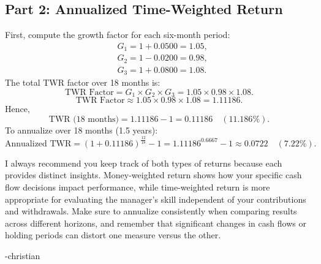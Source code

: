 \subsection*{Part 2: Annualized Time-Weighted Return}
First, compute the growth factor for each six-month period:
\[
\begin{aligned}
&G_1 = 1 + 0.0500 = 1.05,\\
&G_2 = 1 - 0.0200 = 0.98,\\
&G_3 = 1 + 0.0800 = 1.08.
\end{aligned}
\]
The total TWR factor over 18 months is:
\[
\text{TWR Factor} = G_1 \times G_2 \times G_3 = 1.05 \times 0.98 \times 1.08.
\]
\[
\text{TWR Factor} \approx 1.05 \times 0.98 \times 1.08 = 1.11186.
\]
Hence,
\[
\text{TWR (18 months)} = 1.11186 - 1 = 0.11186 \quad (11.186\%).
\]
To annualize over 18 months (1.5 years):
\[
\text{Annualized TWR} = (1 + 0.11186)^{\frac{12}{18}} - 1 = 1.11186^{0.6667} - 1 \approx 0.0722 \quad (7.22\%).
\]

\begin{infobox}

I always recommend you keep track of both types of returns because each provides distinct insights. Money-weighted return shows how your specific cash flow decisions impact performance, while time-weighted return is more appropriate for evaluating the manager’s skill independent of your contributions and withdrawals. Make sure to annualize consistently when comparing results across different horizons, and remember that significant changes in cash flows or holding periods can distort one measure versus the other.

-christian

\end{infobox}